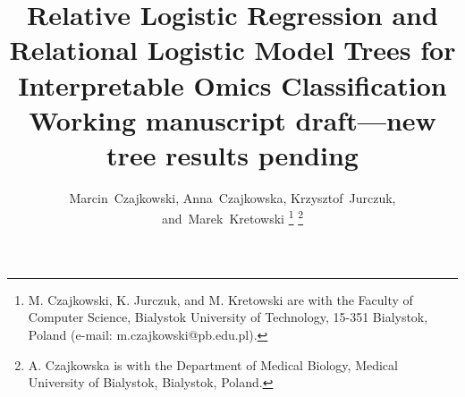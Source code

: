 \documentclass[journal]{IEEEtran}
\begin{document}
\title{Relative Logistic Regression and Relational Logistic Model Trees for Interpretable Omics Classification\\\small Working manuscript draft---new tree results pending}

\author{Marcin~Czajkowski,
        Anna~Czajkowska,
        Krzysztof~Jurczuk,
        and~Marek~Kretowski%
\thanks{M. Czajkowski, K. Jurczuk, and M. Kretowski are with the Faculty of Computer Science, Bialystok University of Technology, 15-351 Bialystok, Poland (e-mail: m.czajkowski@pb.edu.pl).}%
\thanks{A. Czajkowska is with the Department of Medical Biology, Medical University of Bialystok, Bialystok, Poland.}}

\maketitle
\end{document}
